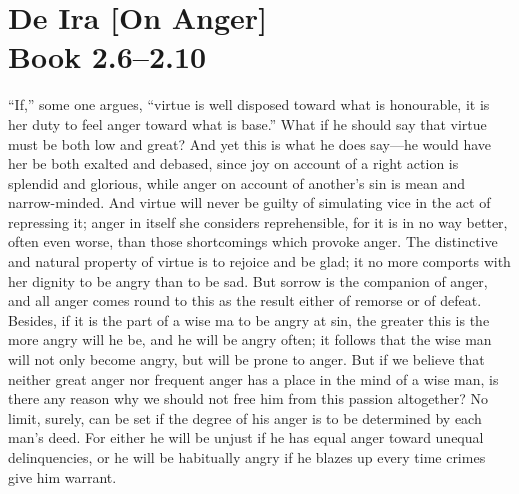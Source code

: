 
\author{Seneca}
\chapter[Seneca -- De Ira, bk. 2.6--2.10]{De Ira [On Anger]\\\smaller
Book 2.6--2.10}


``If,'' some one argues, ``virtue is well disposed toward
what is honourable, it is her duty to feel anger toward what is
base.'' What if he should say that virtue must be both low and great?
And yet this is what he does say---he would have her be both exalted
and debased, since joy on account of a right action is splendid and
glorious, while anger on account of another's sin is mean and
narrow-minded.  And virtue will never be guilty of
simulating vice in the act of repressing it; anger in itself she
considers reprehensible, for it is in no way better, often even worse,
than those shortcomings which provoke anger. The distinctive and
natural property of virtue is to rejoice and be glad; it no more
comports with her dignity to be angry than to be sad. But sorrow is
the companion of anger, and all anger comes round to this as the
result either of remorse or of defeat. Besides, if it is the part of a
wise ma to be angry at sin, the greater this is the more angry will he
be, and he will be angry often; it follows that the wise man will not
only become angry, but will be prone to anger. But if we believe that
neither great anger nor frequent anger has a place in the mind of a
wise man, is there any reason why we should not free him from this
passion altogether? No limit, surely, can be set if the degree of his
anger is to be determined by each man's deed. For either he will be
unjust if he has equal anger toward unequal delinquencies, or he will
be habitually angry if he blazes up every time crimes give him
warrant.

